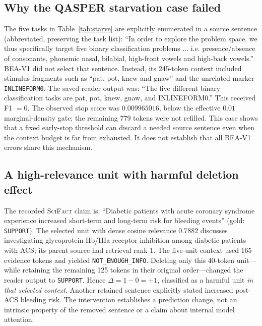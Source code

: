 \documentclass[10pt,twocolumn,letterpaper]{article}
\newcommand{\scifact}{\textsc{SciFact}\xspace}
\begin{document}
\subsection{Why the QASPER starvation case failed}
The five tasks in Table~\ref{tab:starve} are explicitly enumerated in a source sentence (abbreviated, preserving the task list): ``In order to explore the problem space, we thus specifically target five binary classification problems ... i.e. presence/absence of consonants, phonemic nasal, bilabial, high-front vowels and high-back vowels.'' BEA-V1 did not select that sentence. Instead, its 245-token context included stimulus fragments such as ``pat, pot, knew and gnaw'' and the unrelated marker \texttt{INLINEFORM0}. The saved reader output was: ``The five different binary classification tasks are pat, pot, knew, gnaw, and INLINEFORM0.'' This received F1 $=0$. The observed stop score was $0.009965016$, below the effective $0.01$ marginal-density gate; the remaining 779 tokens were not refilled. This case shows that a fixed early-stop threshold can discard a needed source sentence even when the context budget is far from exhausted. It does not establish that all BEA-V1 errors share this mechanism.

\subsection{A high-relevance unit with harmful deletion effect}
The recorded \scifact claim is: ``Diabetic patients with acute coronary syndrome experience increased short-term and long-term risk for bleeding events'' (gold: \texttt{SUPPORT}). The selected unit with dense cosine relevance $0.7882$ discusses investigating glycoprotein IIb/IIIa receptor inhibition among diabetic patients with ACS; its parent source had retrieval rank 1. The five-unit context used 165 evidence tokens and yielded \texttt{NOT\_ENOUGH\_INFO}. Deleting only this 40-token unit---while retaining the remaining 125 tokens in their original order---changed the reader output to \texttt{SUPPORT}. Hence $\Delta = 1 - 0 = +1$, classified as a harmful unit \emph{in that selected context}. Another retained sentence explicitly stated increased post-ACS bleeding risk. The intervention establishes a prediction change, not an intrinsic property of the removed sentence or a claim about internal model attention.
\end{document}

